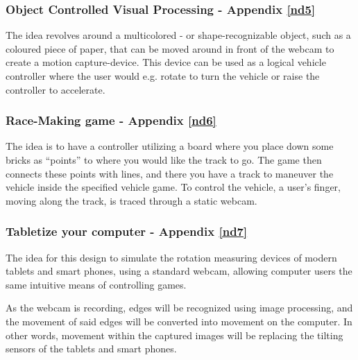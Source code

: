 \subsubsection{Object Controlled Visual Processing - Appendix \ref{nd5}}
The idea revolves around a multicolored - or shape-recognizable object, such as a coloured piece of paper, that can be moved around in front of the webcam to create a motion capture-device. This device can be used as a logical vehicle controller where the user would e.g. rotate to turn the vehicle or raise the controller to accelerate.

\subsubsection{Race-Making game - Appendix \ref{nd6}}
The idea is to have a controller utilizing a board where you place down some bricks as “points” to where you would like the track to go. The game then connects these points with lines, and there you have a track to maneuver the vehicle inside the specified vehicle game. To control the vehicle, a user’s finger, moving along the track, is traced through a static webcam.

\subsubsection{Tabletize your computer - Appendix \ref{nd7}}
The idea for this design to simulate the rotation measuring devices of modern tablets and smart phones, using a standard webcam, allowing computer users the same intuitive means of controlling games.

As the webcam is recording, edges will be recognized using image processing, and the movement of said edges will be converted into movement on the computer. In other words, movement within the captured images will be replacing the tilting sensors of the tablets and smart phones.

